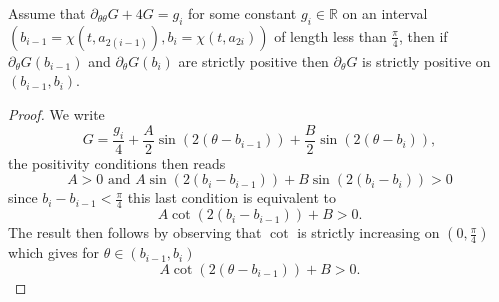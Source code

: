 \documentclass[10pt,a4paper]{amsart}
\begin{document}
\begin{lemma}\label{lem:prf rlx cst c0}
Assume that $\partial_{\theta\theta}G+4G=g_i$ for some constant $g_i\in \mathbb{R}$ on an interval $(b_{i-1}=\chi(t,a_{2(i-1)}),b_i=\chi(t,a_{2i}))$ of length less than $\frac{\pi}{4}$, then if $\partial_\theta G(b_{i-1})$ and $\partial_\theta G(b_{i})$ are strictly positive then $\partial_\theta G$ is strictly positive on $(b_{i-1},b_i)$.
\end{lemma}

\begin{proof}
We write 
\[
G=\frac{g_i}{4}+\frac{A}{2}\sin(2(\theta-b_{i-1}))+\frac{B}{2}\sin(2(\theta-b_{i})),
\]
the positivity conditions then reads
\[
A>0 \text{ and } A\sin(2(b_i-b_{i-1}))+B\sin(2(b_i-b_{i}))>0
\]
since $b_i-b_{i-1}<\frac{\pi}{4}$ this last condition is equivalent to 
\[
A\cot(2(b_i-b_{i-1}))+B>0.
\]
The result then follows by observing that $\cot$ is strictly increasing on $(0,\frac{\pi}{4})$ which gives for $\theta\in (b_{i-1},b_i)$
\[
A\cot(2(\theta-b_{i-1}))+B>0.
\]
\end{proof}
\end{document}

